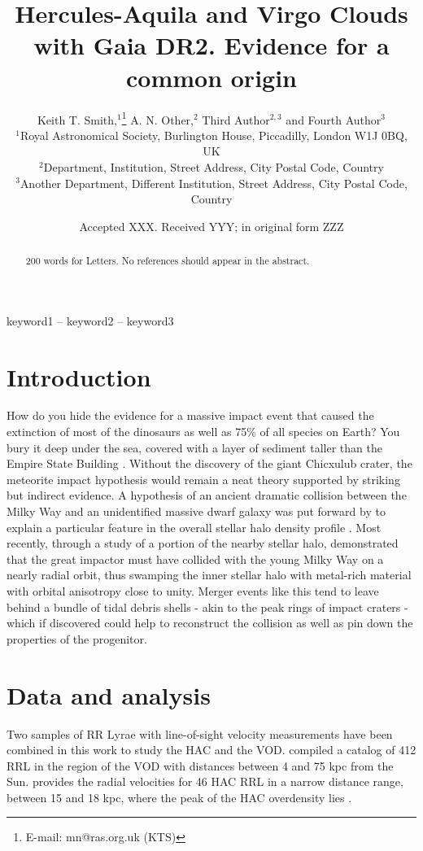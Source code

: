 \documentclass[fleqn,usenatbib]{mnras}
\title[Hercules-Aquila and Virgo Clouds with Gaia DR2]{Hercules-Aquila
  and Virgo Clouds with Gaia DR2. Evidence for a common origin}
\author[K. T. Smith et al.]{
Keith T. Smith,$^{1}$\thanks{E-mail: mn@ras.org.uk (KTS)}
A. N. Other,$^{2}$
Third Author$^{2,3}$
and Fourth Author$^{3}$
\\
$^{1}$Royal Astronomical Society, Burlington House, Piccadilly, London W1J 0BQ, UK\\
$^{2}$Department, Institution, Street Address, City Postal Code, Country\\
$^{3}$Another Department, Different Institution, Street Address, City Postal Code, Country
}
\date{Accepted XXX. Received YYY; in original form ZZZ}
\begin{document}
\label{firstpage}
\pagerange{\pageref{firstpage}--\pageref{lastpage}}
\maketitle

\begin{abstract}
200 words for Letters.
No references should appear in the abstract.
\end{abstract}

\begin{keywords}
keyword1 -- keyword2 -- keyword3
\end{keywords}



\section{Introduction}

How do you hide the evidence for a massive impact event that caused
the extinction of most of the dinosaurs as well as 75\% of all species
on Earth? You bury it deep under the sea, covered with a layer of
sediment taller than the Empire State Building
\citep[][]{Hildebrand1991}. Without the discovery of the giant
Chicxulub crater, the meteorite impact hypothesis would remain a neat
theory supported by striking but indirect evidence. A hypothesis of an
ancient dramatic collision between the Milky Way and an unidentified
massive dwarf galaxy was put forward by \citet{Deason2013} to explain
a particular feature in the overall stellar halo density profile
\citep[][]{Wa09,De11}. Most recently, through a study of a portion of
the nearby stellar halo, \citet{Belokurov2018} demonstrated that the
great impactor must have collided with the young Milky Way on a nearly
radial orbit, thus swamping the inner stellar halo with metal-rich
material with orbital anisotropy \citep[see][]{Binney2008} close to
unity. Merger events like this tend to leave behind a bundle of tidal
debris shells \citep[see][]{Amorisco2015,Hendel2015} - akin to the
peak rings of impact craters \citep[see e.g.][]{Morgan2016} - which if
discovered could help to reconstruct the collision as well as pin down
the properties of the progenitor.


\section{Data and analysis}
Two samples of RR Lyrae with line-of-sight velocity measurements have been combined in this work to study the HAC and the VOD. \cite{Vivas2016} compiled a catalog of 412 RRL in the region of the VOD with distances between 4 and 75 kpc from the Sun. \cite{Simion2018} provides the radial velocities for 46 HAC RRL in a narrow distance range, between 15 and 18 kpc, where the peak of the HAC overdensity lies \citet{Simion2014}. 
%
\end{document}
